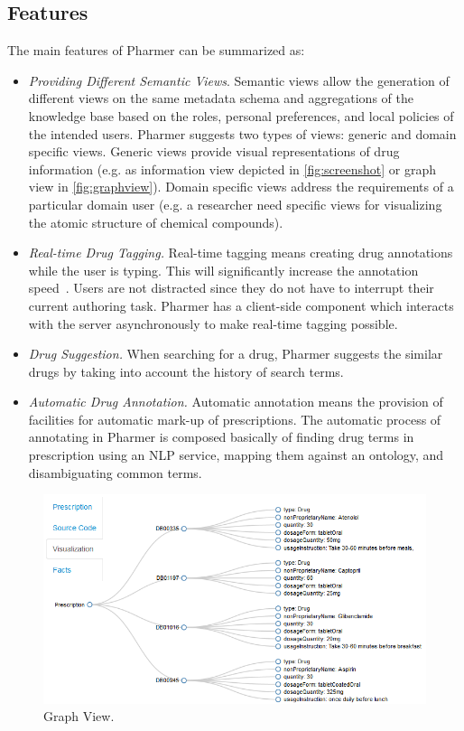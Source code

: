 \documentclass[10pt, conference, compsocconf]{IEEEtran}
\begin{document}
\subsection{Features}
The main features of Pharmer can be summarized as:
\begin{itemize}
	\item \emph{Providing Different Semantic Views}.
	Semantic views allow the generation of different views on the same metadata schema and aggregations of the knowledge base based on the roles, personal preferences, and local policies of the intended users.
	Pharmer suggests two types of views: generic and domain specific views.
	Generic views provide visual representations of drug information (e.g. as information view depicted in \autoref{fig:screenshot} or graph view in \autoref{fig:graphview}).
	Domain specific views address the requirements of a particular domain user (e.g. a researcher need specific views for visualizing the atomic structure of chemical compounds).
	\item \emph{Real-time Drug Tagging.}
	Real-time tagging means creating drug annotations while the user is typing.
	This will significantly increase the annotation speed~\cite{OCA,Reflect}.
	Users are not distracted since they do not have to interrupt their current authoring task.
	Pharmer has a client-side component which interacts with the server asynchronously to make real-time tagging possible.
	\item \emph{Drug Suggestion.}
		When searching for a drug, Pharmer suggests the similar drugs by taking into account the history of search terms.
    \item \emph{Automatic Drug Annotation.}
    Automatic annotation means the provision of facilities for automatic mark-up of prescriptions.
    The automatic process of annotating in Pharmer is composed basically of finding drug terms in prescription using an NLP service, mapping them against an ontology, and disambiguating common terms.
\end{itemize}


\begin{figure}[tb]
	\centering
		\includegraphics[width=1.0\columnwidth]{images/sc2.png}
	\caption{Graph View.}
	\label{fig:graphview}
\end{figure}
\end{document}
